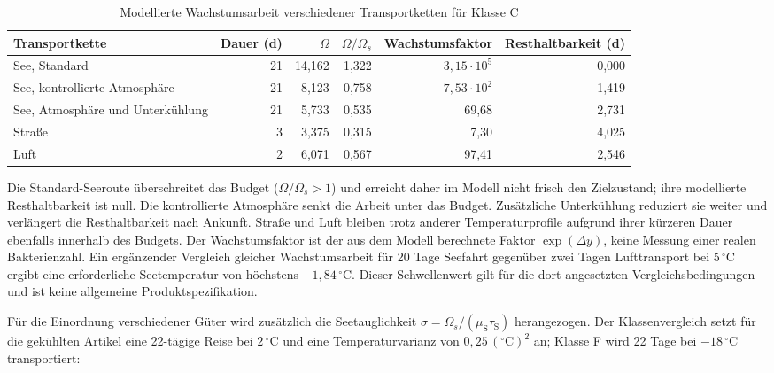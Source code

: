 \documentclass[a4paper, 12pt, twoside, openright]{report}
\theoremstyle{definition}
\theoremstyle{definition}
\begin{document}
\begin{table}
  \centering
  \small
  \caption{Modellierte Wachstumsarbeit verschiedener Transportketten für Klasse C}
  \label{tab:experiment-seefracht-ketten}
  \begin{tabular}{lrrrrr}
    \toprule
    Transportkette & Dauer (d) & $\Omega$ & $\Omega/\Omega_s$ &
      Wachstumsfaktor & Resthaltbarkeit (d) \\
    \midrule
    See, Standard & 21 & 14{,}162 & 1{,}322 & $3{,}15\cdot10^5$ & 0{,}000 \\
    See, kontrollierte Atmosphäre & 21 & 8{,}123 & 0{,}758 & $7{,}53\cdot10^2$ & 1{,}419 \\
    See, Atmosphäre und Unterkühlung & 21 & 5{,}733 & 0{,}535 & 69{,}68 & 2{,}731 \\
    Straße & 3 & 3{,}375 & 0{,}315 & 7{,}30 & 4{,}025 \\
    Luft & 2 & 6{,}071 & 0{,}567 & 97{,}41 & 2{,}546 \\
    \bottomrule
  \end{tabular}
\end{table}

Die Standard-Seeroute überschreitet das Budget ($\Omega/\Omega_s>1$) und
erreicht daher im Modell nicht frisch den Zielzustand; ihre modellierte
Resthaltbarkeit ist null. Die kontrollierte Atmosphäre senkt die Arbeit unter
das Budget. Zusätzliche Unterkühlung reduziert sie weiter und verlängert die
Resthaltbarkeit nach Ankunft. Straße und Luft bleiben trotz anderer
Temperaturprofile aufgrund ihrer kürzeren Dauer ebenfalls innerhalb des
Budgets. Der Wachstumsfaktor ist der aus dem Modell berechnete Faktor
$\exp(\Delta y)$, keine Messung einer realen Bakterienzahl. Ein ergänzender
Vergleich gleicher Wachstumsarbeit für 20 Tage Seefahrt gegenüber zwei Tagen
Lufttransport bei $5\,{}^\circ$C ergibt eine erforderliche Seetemperatur von
höchstens $-1{,}84\,{}^\circ$C. Dieser Schwellenwert gilt für die dort
angesetzten Vergleichsbedingungen und ist keine allgemeine
Produktspezifikation.

Für die Einordnung verschiedener Güter wird zusätzlich die Seetauglichkeit
$\sigma=\Omega_s/(\mu_{\mathrm S}\tau_{\mathrm S})$ herangezogen. Der
Klassenvergleich setzt für die gekühlten Artikel eine 22-tägige Reise bei
$2\,{}^\circ$C und eine Temperaturvarianz von $0{,}25\,({}^\circ\mathrm C)^2$ an;
Klasse F wird 22 Tage bei $-18\,{}^\circ$C transportiert:
\end{document}
